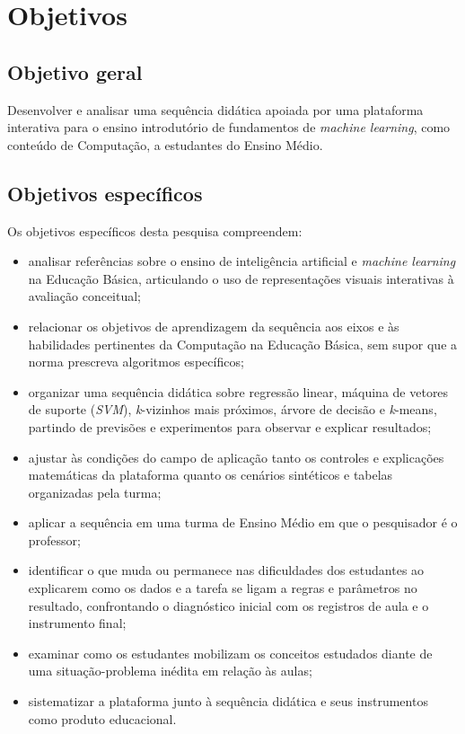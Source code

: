 \chapter{Objetivos}

\section{Objetivo geral}

Desenvolver e analisar uma sequência didática apoiada por uma plataforma interativa para o ensino introdutório de fundamentos de \textit{machine learning}, como conteúdo de Computação, a estudantes do Ensino Médio.

\section{Objetivos específicos}

Os objetivos específicos desta pesquisa compreendem:

\begin{itemize}
    \item analisar referências sobre o ensino de inteligência artificial e \textit{machine learning} na Educação Básica, articulando o uso de representações visuais interativas à avaliação conceitual;
    \item relacionar os objetivos de aprendizagem da sequência aos eixos e às habilidades pertinentes da Computação na Educação Básica, sem supor que a norma prescreva algoritmos específicos;
    \item organizar uma sequência didática sobre regressão linear, máquina de vetores de suporte (\textit{SVM}), \textit{k}-vizinhos mais próximos, árvore de decisão e \textit{k}-means, partindo de previsões e experimentos para observar e explicar resultados;
    \item ajustar às condições do campo de aplicação tanto os controles e explicações matemáticas da plataforma quanto os cenários sintéticos e tabelas organizadas pela turma;
    \item aplicar a sequência em uma turma de Ensino Médio em que o pesquisador é o professor;
    \item identificar o que muda ou permanece nas dificuldades dos estudantes ao explicarem como os dados e a tarefa se ligam a regras e parâmetros no resultado, confrontando o diagnóstico inicial com os registros de aula e o instrumento final;
    \item examinar como os estudantes mobilizam os conceitos estudados diante de uma situação-problema inédita em relação às aulas;
    \item sistematizar a plataforma junto à sequência didática e seus instrumentos como produto educacional.
\end{itemize}

